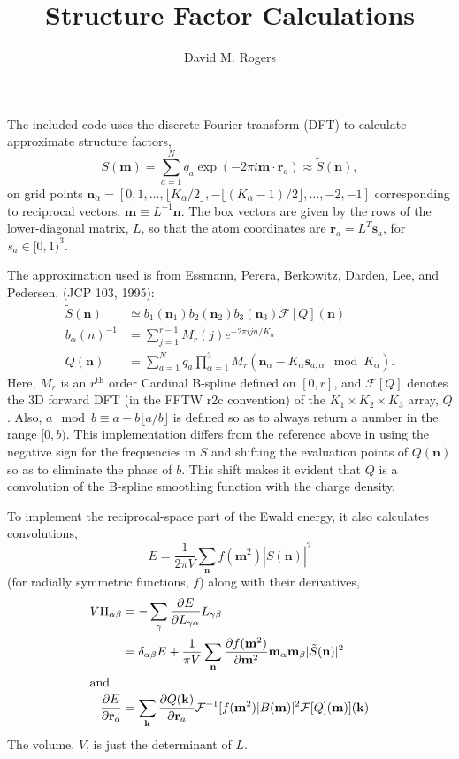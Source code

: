 \documentclass{amsart}
\title{ Structure Factor Calculations}
\author{ David M. Rogers}
\renewcommand{\vec}[1]{\mathbf{#1}}
\begin{document}
  The included code uses the discrete Fourier transform (DFT)
to calculate approximate structure factors,
\begin{equation}
S(\vec m) = \sum_{a=1}^N q_a \exp(-2\pi i \vec m\cdot \vec r_a)
  \approx \tilde S(\vec n),
\end{equation}
on grid points $\vec n_\alpha = [0, 1, \ldots, \lfloor K_\alpha/2 \rfloor, -\lfloor (K_\alpha-1)/2 \rfloor, \ldots, -2, -1]$
corresponding to reciprocal vectors, $\vec m \equiv L^{-1} \vec n$.
The box vectors are given by the rows of the lower-diagonal matrix,
$L$, so that the atom coordinates are $\vec r_a = L^T \vec s_a$,
for $s_a \in [0,1)^3$.

  The approximation used is from Essmann, Perera, Berkowitz,
Darden, Lee, and Pedersen, (JCP 103, 1995):
\begin{align}
\tilde S(\vec n) &\simeq b_1(\vec n_1) b_2(\vec n_2) b_3(\vec n_3)
                         \mathcal F[Q](\vec n) \\
b_\alpha(n)^{-1} &= \sum_{j=1}^{r-1} M_r(j) e^{-2\pi i j n/K_\alpha} \\
Q(\vec n) &= \sum_{a=1}^N q_a \prod_{\alpha=1}^3
                M_r(\vec n_\alpha - K_\alpha \vec s_{a,\alpha} \mod K_\alpha)
.
\end{align}
Here, $M_r$ is an $r^\text{th}$ order Cardinal B-spline defined on $[0,r]$,
and $\mathcal F[Q]$ denotes the 3D forward DFT (in the FFTW r2c convention)
of the $K_1 \times K_2 \times K_3$ array, $Q$.
Also, $a \mod b \equiv a - b \lfloor a/b \rfloor$
is defined so as to always return a number in the range $[0,b)$.
This implementation differs from the reference above in using the negative
sign for the frequencies in $S$ and shifting the evaluation points
of $Q(\vec n)$ so as to eliminate the phase of $b$.  This
shift makes it evident that $Q$ is a convolution of the B-spline
smoothing function with the charge density.

  To implement the reciprocal-space part of the Ewald energy, it also
calculates convolutions,
\begin{equation}
E = \frac{1}{2\pi V} \sum_{\vec n} f(\vec m^2) |\tilde S(\vec n)|^2
\end{equation}
(for radially symmetric functions, $f$)
along with their derivatives,
\begin{align}
V \Pi_{\alpha\beta} &= -\sum_\gamma \frac{\partial E}{\partial L_{\gamma\alpha}}
            L_{\gamma\beta} \\
  &= \delta_{\alpha\beta} E
        + \frac{1}{\pi V} \sum_{\vec n}
                            \frac{\partial f(\vec m^2)}{\partial \vec m^2}
            \vec m_\alpha \vec m_\beta |\tilde S(\vec n)|^2 \\
\intertext{and}
\frac{\partial E}{\partial \vec r_a} &= \sum_{\vec k}
  \frac{\partial Q(\vec k)}{\partial \vec r_a}
                    \mathcal F^{-1}[ f(\vec m^2) |B(\vec m)|^2 \mathcal F[Q](\vec m) ](\vec k)
\end{align}
The volume, $V$, is just the determinant of $L$.
\end{document}
